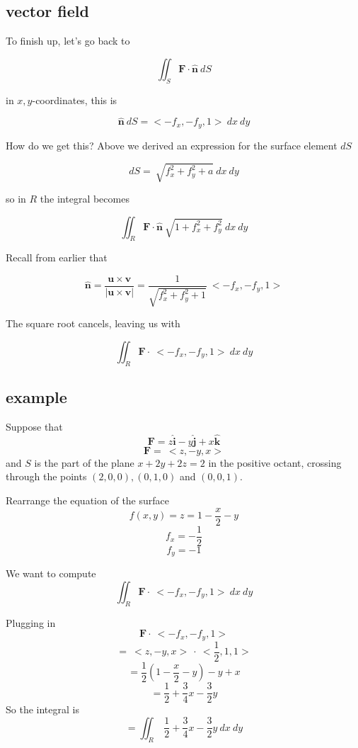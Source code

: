 \documentclass[11pt, oneside]{article}   	%
\begin{document}
\subsection*{vector field}
To finish up, let's go back to

\[ \iint_S \mathbf{F} \cdot \hat{\mathbf{n}} \ dS \]

in $x,y$-coordinates, this is

\[ \hat{\mathbf{n}} \ dS = < -f_x,-f_y,1>  \ dx \ dy \]

How do we get this?  Above we derived an expression for the surface element $dS$

\[ dS = \ \sqrt{f_x^2 + f_y^2 + a} \ dx \ dy \]

so in $R$ the integral becomes

\[ \iint_R \mathbf{F} \cdot \hat{\mathbf{n}} \ \sqrt{1 + f_x^2 + f_y^2} \ dx \ dy \]

Recall from earlier that

\[  \hat{\mathbf{n}} = \frac{\mathbf{u} \times \mathbf{v}}{| \mathbf{u} \times \mathbf{v} |} = \frac{1}{\sqrt{f_x^2  + f_y^2 + 1}} \ < -f_x, - f_y , 1 > \]

The square root cancels, leaving us with

\[ \iint_R \mathbf{F} \cdot \ < -f_x,-f_y,1>  \ dx \ dy \]

\subsection*{example}

Suppose that
\[ \mathbf{F} = z \hat{\mathbf{i}} - y \hat{\mathbf{j}} + x  \hat{\mathbf{k}} \]
\[ \mathbf{F} = \ <z,-y,x> \]
and $S$ is the part of the plane $x + 2y + 2z = 2$ in the positive octant, crossing through the points $(2,0,0),(0,1,0)$ and $(0,0,1)$.

Rearrange the equation of the surface
\[ f(x,y) = z = 1 - \frac{x}{2} - y \]
\[ f_x = -\frac{1}{2} \]
\[ f_y = -1 \]

We want to compute
\[ \iint_R \mathbf{F} \cdot \ < -f_x,-f_y,1>  \ dx \ dy \]

Plugging in
\[ \mathbf{F} \cdot \ < -f_x,-f_y,1> \]
\[ = \ <z,-y,x> \ \cdot \ < \frac{1}{2},1,1> \]
\[ = \frac{1}{2}(1 - \frac{x}{2} - y) - y + x \]
\[ = \frac{1}{2} + \frac{3}{4}x - \frac{3}{2}y \]
So the integral is
\[ =  \iint_R \ \frac{1}{2} + \frac{3}{4}x - \frac{3}{2}y  \ dx \ dy \]
\end{document}
